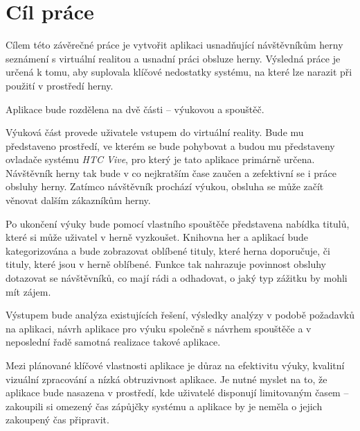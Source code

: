 \section{Cíl práce}\label{cuxedl-pruxe1ce}

Cílem této závěrečné práce je vytvořit aplikaci usnadňující návštěvníkům
herny seznámení s virtuální realitou a usnadní práci obsluze herny.
Výsledná práce je určená k tomu, aby suplovala klíčové nedostatky
systému, na které lze narazit při použití v prostředí herny.

Aplikace bude rozdělena na dvě části -- výukovou a spouštěč.

Výuková část provede uživatele vstupem do virtuální reality. Bude mu
představeno prostředí, ve kterém se bude pohybovat a budou mu
představeny ovladače systému \emph{HTC Vive}, pro který je tato aplikace
primárně určena. Návštěvník herny tak bude v co nejkratším čase zaučen a
zefektivní se i práce obsluhy herny. Zatímco návštěvník prochází výukou,
obsluha se může začít věnovat dalším zákazníkům herny.

Po ukončení výuky bude pomocí vlastního spouštěče představena nabídka
titulů, které si může uživatel v herně vyzkoušet. Knihovna her a
aplikací bude kategorizována a bude zobrazovat oblíbené tituly, které
herna doporučuje, či tituly, které jsou v herně oblíbené. Funkce tak
nahrazuje povinnost obsluhy dotazovat se návštěvníků, co mají rádi a
odhadovat, o jaký typ zážitku by mohli mít zájem.

Výstupem bude analýza existujících řešení, výsledky analýzy v podobě
požadavků na aplikaci, návrh aplikace pro výuku společně s návrhem
spouštěče a v neposlední řadě samotná realizace takové aplikace.

Mezi plánované klíčové vlastnosti aplikace je důraz na efektivitu výuky,
kvalitní vizuální zpracování a nízká obtruzivnost aplikace. Je nutné
myslet na to, že aplikace bude nasazena v prostředí, kde uživatelé
disponují limitovaným časem -- zakoupili si omezený čas zápůjčky systému
a aplikace by je neměla o jejich zakoupený čas připravit.
